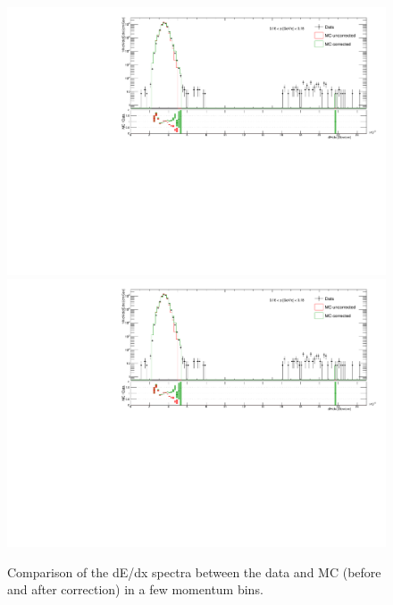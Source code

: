 \begin{figure}[hb]
{  \includegraphics[width=\linewidth,page=29]{graphics/dedx/dEdx_DataVsMC.pdf}\\
  \includegraphics[width=\linewidth,page=39]{graphics/dedx/dEdx_DataVsMC.pdf}
}%
\caption[Comparison of dE/dx spectra between data and MC.]{Comparison of the dE/dx spectra between the data and MC (before and after correction) in a few momentum bins.}\label{fig:dEdxDataVsMC}
\end{figure}








